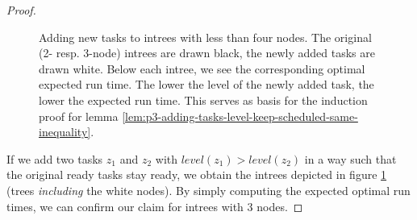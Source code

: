 \begin{proof}
\begin{figure}[t]
    \caption{Adding new tasks to intrees with less than four nodes. The original (2- resp. 3-node) intrees are drawn black, the newly added tasks are drawn white. Below each intree, we see the corresponding optimal expected run time. The lower the level of the newly added task, the lower the expected run time. This serves as basis for the induction proof for lemma \ref{lem:p3-adding-tasks-level-keep-scheduled-same-inequality}.}
    \label{fig:p3-lemma-adding-intrees-induction-start}
  \end{figure}

  If we add two tasks $z_1$ and $z_2$ with $level(z_1)>level(z_2)$ in a way such that the original ready tasks stay ready, we obtain the intrees depicted in figure \ref{fig:p3-lemma-adding-intrees-induction-start} (trees \emph{including} the white nodes). By simply computing the expected optimal run times, we can confirm our claim for intrees with 3 nodes.


\end{proof}
